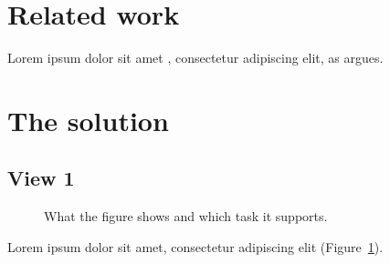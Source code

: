\documentclass{aureport}
\begin{document}
\section{Related work}
Lorem ipsum dolor sit amet \parencite{shneiderman1996}, consectetur adipiscing elit, as \textcite{munzner2009} argues.

\section{The solution}
\subsection{View 1}
\begin{figure}[htb]
  \centering
  \caption{What the figure shows and which task it supports.}
  \label{fig:view1}
\end{figure}
Lorem ipsum dolor sit amet, consectetur adipiscing elit (Figure~\ref{fig:view1}).
\end{document}
